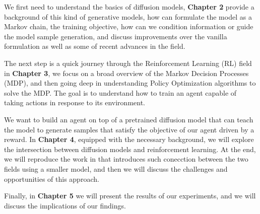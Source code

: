 We first need to understand the basics of diffusion models, \textbf{Chapter 2} provide a background of this kind of generative models, how can formulate the model as a Markov chain, the training objective, how can we condition information or guide the model sample generation, and discuss improvements over the vanilla formulation as well as some of recent advances in the field. 

The next step is a quick journey through the Reinforcement Learning (RL) field in \textbf{Chapter 3}, we focus on a broad overview of the Markov Decision Processes (MDP), and then going deep in understanding Policy Optimization algorithms to solve the MDP. The goal is to understand how to train an agent capable of taking actions in response to its environment. 

We want to build an agent on top of a pretrained diffusion model that can teach the model to generate samples that satisfy the objective of our agent driven by a reward. In \textbf{Chapter 4}, equipped with the necessary background, we will explore the intersection between diffusion models and reinforcement learning. At the end, we will reproduce the work in \cite{black2023training} that introduces such conecction between the two fields using a smaller model, and then we will discuss the challenges and opportunities of this approach. 

Finally, in \textbf{Chapter 5} we will present the results of our experiments, and we will discuss the implications of our findings.